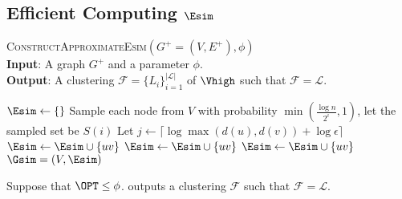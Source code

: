 \subsection{Efficient Computing $\Esim$}

\begin{algorithm}[htbp]
\caption{{\textsc{ConstructApproximateEsim}}$(G^+=(V, E^+), \phi)$\label{alg:main}\\
\textbf{Input}: A graph $G^{+}$ and a parameter $\phi$. \\
\textbf{Output}: A clustering $\mathcal{F} = \{L_i\}_{i=1}^{|\mathcal{L}|}$ of $\Vhigh$ such that $\mathcal{F} = \mathcal{L}$. }
\label{alg:constructesim}
\begin{algorithmic}[1]
    \State $\Esim \leftarrow \{ \}$
    \State Sample each node from $V$ with probability $\min(\frac{\log n}{2^i}, 1)$, let the sampled set be $S(i)$
    \EndFor
        \State Let $j \leftarrow \lceil \log \max(d(u), d(v)) + \log \epsilon \rceil$
            \State $\Esim \leftarrow \Esim \cup \{ uv \}$
        \State $\Esim \leftarrow \Esim \cup \{ uv \}$
        \State $\Esim \leftarrow \Esim \cup \{ uv \}$
        \EndIf
    \EndFor
    \Return $\Gsim = (V, \Esim)$
\EndFunction
\end{algorithmic}
\end{algorithm}

\begin{lemma}
Suppose that $\OPT \leq \phi$.  outputs a clustering $\mathcal{F}$ such that $\mathcal{F} = \mathcal{L}$.
\end{lemma}